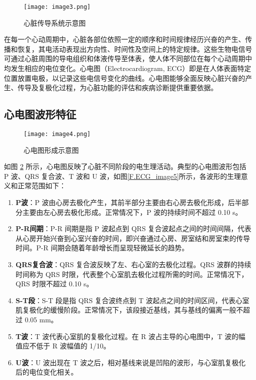 \begin{figure}[hbt]
    \centering
    \texttt{[image: image3.png]}
    \caption{心脏传导系统示意图}
    \label{F.ECG_image3}
\end{figure}

在每一个心动周期中，心脏各部位依照一定的顺序和时间规律经历兴奋的产生、传播和恢复，其电活动表现出方向性、时间性及空间上的特定规律。这些生物电信号可通过心脏周围的导电组织和体液传导至体表，使人体不同部位在每个心动周期中均发生相应的电位变化。心电图（Electrocardiogram, ECG）即是在人体表面特定位置放置电极，以记录这些电信号变化的曲线。心电图能够全面反映心脏兴奋的产生、传导及复极化过程，为心脏功能的评估和疾病诊断提供重要依据。

\subsection{心电图波形特征}

\begin{figure}[hbt]
    \centering
    \texttt{[image: image4.png]}
    \caption{心电图形成示意图\cite{人体解剖生理学}}
    \label{F.ECG_image4}
\end{figure}

如图 \ref{F.ECG_image4} 所示，心电图反映了心脏不同阶段的电生理活动。典型的心电图波形包括 P 波、QRS 复合波、T 波和 U 波，如图\ref{F.ECG_image5}所示，各波形的生理意义和正常范围如下：

\begin{enumerate}
    \item \textbf{P波}：P 波由心房去极化产生，其前半部分主要由右心房去极化形成，后半部分主要由左心房去极化形成。正常情况下，P 波的持续时间不超过 0.10 s。

    \item \textbf{P-R间期}：P-R 间期是指 P 波起点到 QRS 复合波起点之间的时间间隔，代表从心房开始兴奋到心室兴奋的时间，即兴奋通过心房、房室结和房室束的传导时间。P-R 间期会随着年龄增长而呈现轻微延长的趋势。

    \item \textbf{QRS复合波}：QRS 复合波反映了左、右心室的去极化过程。QRS 波群的持续时间称为 QRS 时限，代表整个心室肌去极化过程所需的时间。正常情况下，QRS 时限不超过 0.10 s。
    
    \item \textbf{S-T段}：S-T 段是指 QRS 复合波终点到 T 波起点之间的时间区间，代表心室肌复极化的缓慢阶段。正常情况下，该段接近基线，其与基线的偏离一般不超过 0.05 mm。

    \item \textbf{T波}：T 波代表心室肌的复极化过程。在 R 波占主导的心电图中，T 波的幅值应不低于 R 波幅值的 1/10。

    \item \textbf{U波}：U 波出现在 T 波之后，相对基线来说是凹陷的波形，与心室肌复极化后的电位变化相关。
\end{enumerate}

